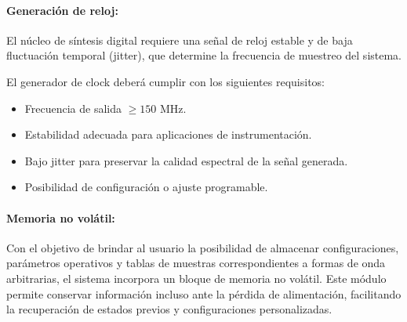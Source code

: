 
\paragraph{Generación de reloj:}
El núcleo de síntesis digital requiere una señal de reloj estable y de baja fluctuación temporal (jitter), que determine la frecuencia de muestreo del sistema.

El generador de clock deberá cumplir con los siguientes requisitos:

\begin{itemize}[label=\textbullet]
	\item Frecuencia de salida $\geq 150$ MHz.
	\item Estabilidad adecuada para aplicaciones de instrumentación.
	\item Bajo jitter para preservar la calidad espectral de la señal generada.
	\item Posibilidad de configuración o ajuste programable.
\end{itemize}


\paragraph{Memoria no volátil:}
Con el objetivo de brindar al usuario la posibilidad de almacenar configuraciones, parámetros operativos y tablas de muestras correspondientes a formas de onda arbitrarias, el sistema incorpora un bloque de memoria no volátil. Este módulo permite conservar información incluso ante la pérdida de alimentación, facilitando la recuperación de estados previos y configuraciones personalizadas.

